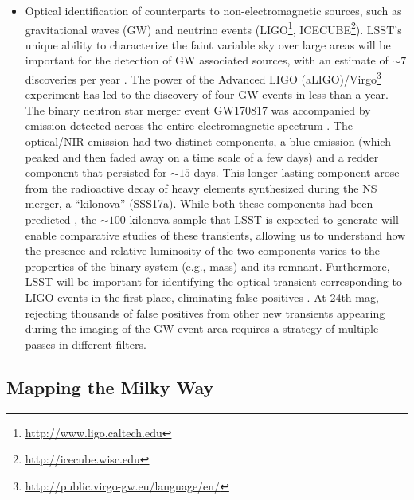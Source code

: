 \begin{itemize}
\item Optical identification of counterparts to non-electromagnetic
  sources, such as gravitational waves (GW) and neutrino events
  (LIGO\footnote{\url{http://www.ligo.caltech.edu}},
  ICECUBE\footnote{\url{http://icecube.wisc.edu}}).  LSST's unique ability
  to characterize the faint variable sky over large areas will be
  important for the detection of GW associated sources, with an estimate
  of $\sim 7$ discoveries per year \citep{2018ApJ...852L...3S}.  The power
  of the Advanced LIGO
  (aLIGO)/Virgo\footnote{\url{http://public.virgo-gw.eu/language/en/}}
  experiment has led to the discovery
  of four GW events in less than a year. The binary
  neutron star merger event GW170817 was accompanied by emission
  detected across the entire electromagnetic spectrum \citep{2017ApJ...848L..12A}.
The optical/NIR emission had two distinct components, a blue emission
(which peaked and then faded away
on a time scale of a few days) and a redder component  that persisted
for $\sim 15$ days.  This longer-lasting component arose from the radioactive decay of heavy elements
synthesized during the NS merger, a ``kilonova'' (SSS17a).
While both these components had been predicted \citep{2017LRR....20....3M},
the $\sim  100$ kilonova sample that LSST is expected to generate will
enable comparative studies of these transients, allowing us to
understand how  the presence and relative luminosity of the two
components varies to the properties of the binary system (e.g., mass)
and its remnant.
  Furthermore, LSST will be important for identifying the optical transient
  corresponding to LIGO events in the first place, eliminating false
  positives \citep{2013ApJ...767..124N,2012ApJ...746...48M,2015ApJ...814...25C, 2017ApJ...849...12C}.  %
  At 24th
  mag, rejecting thousands of false positives from other new
  transients appearing during the imaging of the GW event area
  requires a strategy of multiple passes in different filters.

\end{itemize}


\subsection{Mapping the Milky Way }

